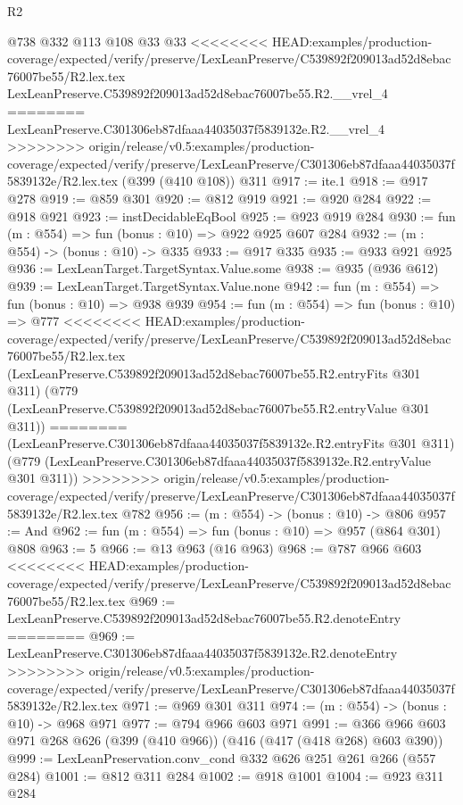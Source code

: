 \begin{lexlean}{R2}
\begin{coremodule}
{{{{{{{{{{{{{{{{{{{{{{    @738
    @332
    @113
    @108
    @33
    @33
<<<<<<<< HEAD:examples/production-coverage/expected/verify/preserve/LexLeanPreserve/C539892f209013ad52d8ebac76007be55/R2.lex.tex
    LexLeanPreserve.C539892f209013ad52d8ebac76007be55.R2.__vrel_4
========
    LexLeanPreserve.C301306eb87dfaaa44035037f5839132e.R2.__vrel_4
>>>>>>>> origin/release/v0.5:examples/production-coverage/expected/verify/preserve/LexLeanPreserve/C301306eb87dfaaa44035037f5839132e/R2.lex.tex
    (@399 (@410 @108))
    @311
@917 := ite.{1}
@918 := @917 @278
@919 := @859 @301
@920 := @812 @919
@921 := @920 @284
@922 := @918 @921
@923 := instDecidableEqBool
@925 := @923 @919 @284
@930 := fun (m : @554) => fun (bonus : @10) => @922 @925 @607 @284
@932 := (m : @554) -> (bonus : @10) -> @335
@933 := @917 @335
@935 := @933 @921 @925
@936 := LexLeanTarget.TargetSyntax.Value.some
@938 := @935 (@936 @612)
@939 := LexLeanTarget.TargetSyntax.Value.none
@942 := fun (m : @554) => fun (bonus : @10) => @938 @939
@954 := fun (m : @554) =>
  fun (bonus : @10) =>
  @777
<<<<<<<< HEAD:examples/production-coverage/expected/verify/preserve/LexLeanPreserve/C539892f209013ad52d8ebac76007be55/R2.lex.tex
    (LexLeanPreserve.C539892f209013ad52d8ebac76007be55.R2.entryFits @301 @311)
    (@779 (LexLeanPreserve.C539892f209013ad52d8ebac76007be55.R2.entryValue @301 @311))
========
    (LexLeanPreserve.C301306eb87dfaaa44035037f5839132e.R2.entryFits @301 @311)
    (@779 (LexLeanPreserve.C301306eb87dfaaa44035037f5839132e.R2.entryValue @301 @311))
>>>>>>>> origin/release/v0.5:examples/production-coverage/expected/verify/preserve/LexLeanPreserve/C301306eb87dfaaa44035037f5839132e/R2.lex.tex
    @782
@956 := (m : @554) -> (bonus : @10) -> @806
@957 := And
@962 := fun (m : @554) => fun (bonus : @10) => @957 (@864 @301) @808
@963 := 5
@966 := @13 @963 (@16 @963)
@968 := @787 @966 @603
<<<<<<<< HEAD:examples/production-coverage/expected/verify/preserve/LexLeanPreserve/C539892f209013ad52d8ebac76007be55/R2.lex.tex
@969 := LexLeanPreserve.C539892f209013ad52d8ebac76007be55.R2.denoteEntry
========
@969 := LexLeanPreserve.C301306eb87dfaaa44035037f5839132e.R2.denoteEntry
>>>>>>>> origin/release/v0.5:examples/production-coverage/expected/verify/preserve/LexLeanPreserve/C301306eb87dfaaa44035037f5839132e/R2.lex.tex
@971 := @969 @301 @311
@974 := (m : @554) -> (bonus : @10) -> @968 @971
@977 := @794 @966 @603 @971
@991 := @366 @966 @603 @971 @268 @626 (@399 (@410 @966)) (@416 (@417 (@418 @268) @603 @390))
@999 := LexLeanPreservation.conv_cond @332 @626 @251 @261 @266 (@557 @284)
@1001 := @812 @311 @284
@1002 := @918 @1001
@1004 := @923 @311 @284
}}}}}}}}}}}}}}}}}}}}}}
\end{coremodule}
\end{lexlean}
